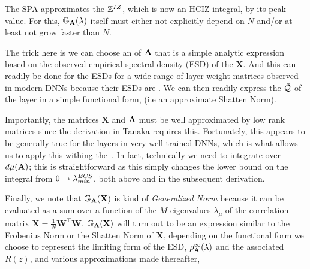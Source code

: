 The SPA approximates the \PartitionFunction $\mathbb{Z}^{IZ}$, which is now an HCIZ integral,  by its peak value.
For this, $\mathbb{G}_{\mathbf{A}}(\lambda)$ itself must either not explicitly depend on $N$ and/or at least not grow faster than $N$.

The trick here is we can choose an \RTransform of $\mathbf{\mathbf{A}}$
that is a simple analytic expression based on the observed
empirical spectral density (ESD) of the $\mathbf{X}$.
And this can readily be done for the ESDs for a wide range of layer weight matrices
observed in modern DNNs because their ESDs are \HeavyTailed \PowerLaw\cite{MM19_HTSR_ICML}.
We can then readily express the \Quality $\bar{\mathcal{Q}}$ of the \Teacher
layer in a simple functional form, (i.e  an approximate Shatten Norm).

Importantly, the matrices $\mathbf{X}$  and $\mathbf{\mathbf{A}}$ must be well approximated
by low rank matrices since the derivation in Tanaka requires this.  Fortunately,
this appears to be generally true for the layers in very well trained DNNs,
which is what allows us to apply this withing the~\ECS.
In fact, technically we need to integrate over $d\mu(\tilde{\mathbf{A}})$; this is straightforward
as this simply changes the lower bound on the integral from $0\rightarrow\lambda^{ECS}_{min}$,
both above and in the subsequent derivation.

Finally, we note that $\mathbb{G}_{\mathbf{A}}(\mathbf{X})$ is kind of \emph{Generalized Norm} because 
it can be evaluated as a sum over a function of the $M$ eigenvalues $\lambda_{\mu}$ of the \Teacher
correlation matrix $\mathbf{X}=\frac{1}{N}\mathbf{W}^{\top}\mathbf{W}$.
$\mathbb{G}_{\mathbf{A}}(\mathbf{X})$ will turn out to be an expression similar to the Frobenius Norm or the
Shatten Norm of $\mathbf{X}$, depending on the functional form we choose to represent the
limiting form of the \Student ESD, $\rho_{\mathbf{A}}^{\infty}(\lambda)$ and the associated \RTransform $R(z)$, and various approximations made thereafter,






%
